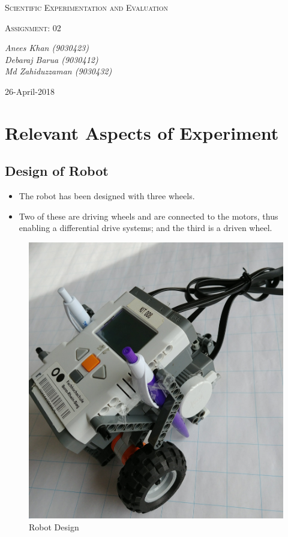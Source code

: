 \documentclass[10pt,a4paper]{article}
\begin{document}
	\begin{titlepage}
	\centering

		{\scshape\LARGE Scientific Experimentation and Evaluation\par}

		{\scshape\Large Assignment: 02\par}

		\vfill

		\vfill
		{\Large\itshape Anees Khan (9030423)
			\\Debaraj Barua (9030412)\\
			Md Zahiduzzaman (9030432)
			\par}
		\vfill

		{\large 26-April-2018\par}
	\end{titlepage}
	\tableofcontents
	\listoffigures	
	\listoftables
	\newpage
	\section{Relevant Aspects of Experiment}
	\subsection{Design of Robot}
		\begin{itemize}
			\item The robot has been designed with three wheels.
			\item Two of these are driving wheels and are connected to the motors, thus enabling a differential drive systems; and the third is a driven wheel.
		\end{itemize}
		\begin{figure}[h]
			\centering
			\includegraphics[scale=0.1]{bot.jpg}
			\caption{Robot Design}
		\end{figure}
\end{document}
